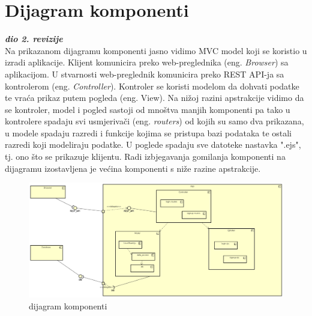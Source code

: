 			\eject
		\section{Dijagram komponenti}
		
			\textbf{\textit{dio 2. revizije}}\\
		
			 Na prikazanom dijagramu komponenti jasno vidimo MVC model koji se koristio u izradi aplikacije. Klijent komunicira preko web-preglednika (eng. \textit{Browser}) sa aplikacijom. U stvarnosti web-preglednik komunicira preko REST API-ja sa kontrolerom (eng. \textit{Controller}). Kontroler se koristi modelom da dohvati podatke te vraća prikaz putem pogleda (eng. View). Na nižoj razini apstrakcije vidimo da se kontroler, model i pogled sastoji od mnoštva manjih komponenti pa tako u kontrolere spadaju svi usmjerivači (eng. \textit{routers}) od kojih su samo dva prikazana, u modele spadaju razredi i funkcije kojima se pristupa bazi podataka te ostali razredi koji modeliraju podatke. U poglede spadaju sve datoteke nastavka ".ejs", tj. ono što se prikazuje klijentu. Radi izbjegavanja gomilanja komponenti na dijagramu izostavljena je većina komponenti s niže razine apstrakcije.
			 \begin{figure}[H]
			\includegraphics[width=\textwidth]{slike/dijagramKomponenti.png} %
			\caption{dijagram komponenti}
			\label{fig:dijagramKomponenti} %
			\end{figure}